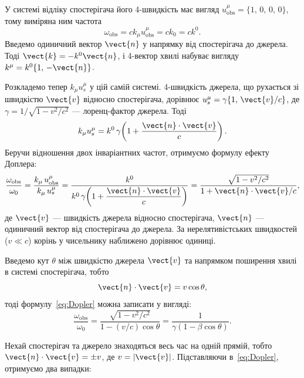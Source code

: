 У системі відліку спостерігача його 4-швидкість має вигляд
$u_{\text{obs}}^{\mu} = \{1,\,0,\, 0,\, 0\}$, тому виміряна ним частота
%
\begin{equation}
    \omega_{\text{obs}} = c k_{\mu} u_{\text{obs}}^{\mu} = c k_0 = c k^0.
\end{equation}
%
Введемо одиничний вектор $\vect{n}$ у напрямку від спостерігача
до джерела. Тоді $\vect{k} = -k^0\vect{n}$, і 4-вектор хвилі
набуває вигляду $k^{\mu} = k^0\{1,\,-\vect{n}\}$.

Розкладемо тепер $k_{\mu}u_s^{\mu}$ у цій самій системі.
4-швидкість джерела, що рухається зі швидкістю $\vect{v}$ відносно
спостерігача, дорівнює
$u_s^{\mu} = \gamma\{1,\,\vect{v}/c\}$,
де $\gamma = 1/\sqrt{1 - v^2/c^2}$ --- лоренц-фактор джерела.
Тоді
%
\begin{equation}
    k_{\mu} u_s^{\mu}
    = k^0\,\gamma\!\left(1 + \frac{\vect{n}\cdot\vect{v}}{c}\right).
\end{equation}
%
Беручи відношення двох інваріантних частот, отримуємо формулу
ефекту Доплера:
\begin{equation}\label{eq:Dopler}
    \frac{\omega_{\text{obs}}}{\omega_0}
    = \frac{k_{\mu}\,u_{\text{obs}}^{\mu}}{k_{\mu}\,u_s^{\mu}}
    = \frac{k^0}{k^0\,\gamma\!\left(1
        + \dfrac{\vect{n}\cdot\vect{v}}{c}\right)}
    = \frac{\sqrt{1 - v^2/c^2}}{1 + \vect{n}\cdot\vect{v}/c},
\end{equation}
де $\vect{v}$ --- швидкість джерела відносно спостерігача,
$\vect{n}$ --- одиничний вектор від спостерігача до джерела.
За нерелятивістських швидкостей ($v \ll c$) корінь у чисельнику
наближено дорівнює одиниці.

Введемо кут $\theta$ між швидкістю джерела $\vect{v}$ та напрямком поширення хвилі
в системі спостерігача, тобто
\[
\vect{n}\cdot\vect{v} = v\cos\theta,
\]
%
тоді формулу~\eqref{eq:Dopler} можна записати у вигляді:
\begin{equation}\label{eq:Dopler_angle}
    \frac{\omega_{\text{obs}}}{\omega_0}
    = \frac{\sqrt{1 - v^2/c^2}}{1 - (v/c)\cos\theta}
    = \frac{1}{\gamma\left(1 - \beta\cos\theta\right)}.
\end{equation}

Нехай спостерігач та джерело знаходяться весь час на одній прямій,
тобто $\vect{n}\cdot\vect{v} = \pm v$, де $v = |\vect{v}|$.
Підставляючи в~\eqref{eq:Dopler}, отримуємо два випадки:

